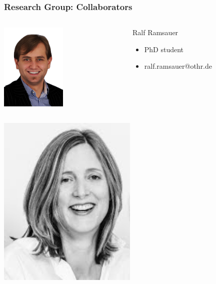 \documentclass[12pt]{beamer}
\begin{document}
	\begin{frame}
	\frametitle{Research Group: Collaborators}
	\begin{minipage}[c]{1.0\linewidth}
		\begin{columns}
		\begin{column}{0.35\textwidth}
			\begin{center}
     		\includegraphics[width=0.5\textwidth]{pics/speakers_ralf.png}
			\end{center}
		\end{column}
		\begin{column}{0.7\textwidth}
		\begin{block}{Ralf Ramsauer}
			\begin{itemize}
				\item PhD student
				\item ralf.ramsauer@othr.de
			\end{itemize}
		\end{block}
		\end{column}
		\end{columns}
	\end{minipage}
	\begin{minipage}[c]{1.0\linewidth}
		\begin{columns}
		\begin{column}{0.35\textwidth}
			\begin{center}
     		\includegraphics[width=0.5\textwidth]{pics/speakers_scherzinger.jpeg}

\end{center}
\end{column}
\end{columns}
\end{minipage}
\end{frame}
\end{document}
